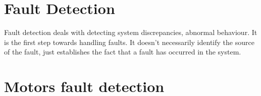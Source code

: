 \section{Fault Detection}

Fault detection deals with detecting system discrepancies, abnormal behaviour. It is the first step towards handling faults. It doesn't necessarily identify the source of the fault, just establishes the fact that a fault has occurred in the system.


\section{Motors fault detection}


